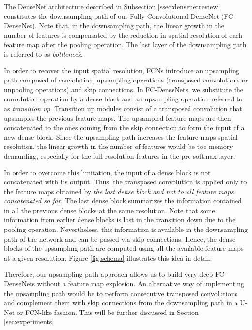 \documentclass[10pt,twocolumn,letterpaper]{article}
\begin{document}
The DenseNet architecture described in Subsection \ref{ssec:densenetreview} constitutes the downsampling path of our Fully Convolutional DenseNet (FC-DenseNet). Note that, in the downsampling path, the linear growth in the number of features is compensated by the reduction in spatial resolution of each feature map after the pooling operation. The last layer of the downsampling path is referred to as \emph{bottleneck}.

In order to recover the input spatial resolution, FCNs introduce an upsampling path composed of convolution, upsampling operations (transposed convolutions or unpooling operations) and skip connections. In FC-DenseNets, we substitute the convolution operation by a dense block and an upsampling operation referred to as \emph{transition up}. Transition up modules consist of a transposed convolution that upsamples the previous feature maps. The upsampled feature maps are then concatenated to the ones coming from the skip connection to form the input of a new dense block. Since the upsampling path increases the feature maps spatial resolution, the linear growth in the number of features would be too memory demanding, especially for the full resolution features in the pre-softmax layer.

In order to overcome this limitation, the input of a dense block is not concatenated with its output. Thus, the transposed convolution is applied only to the feature maps obtained by \emph{the last dense block and not to all feature maps concatenated so far}. The last dense block summarizes the information contained in all the previous dense blocks at the same resolution. Note that some information from earlier dense blocks is lost in the transition down due to the pooling operation. Nevertheless, this information is available in the downsampling path of the network and can be passed via skip connections. Hence, the dense blocks of the upsampling path are computed using all the available feature maps at a given resolution. Figure \ref{fig:schema} illustrates this idea in detail. 


Therefore, our upsampling path approach allows us to build very deep FC-DenseNets without a feature map explosion. An alternative way of implementing the upsampling path would be to perform consecutive transposed convolutions and complement them with skip connections from the downsampling path in a U-Net \cite{ronneberger2015u} or FCN-like \cite{long2015fully} fashion. This will be further discussed in Section \ref{sec:experiments}
\end{document}
